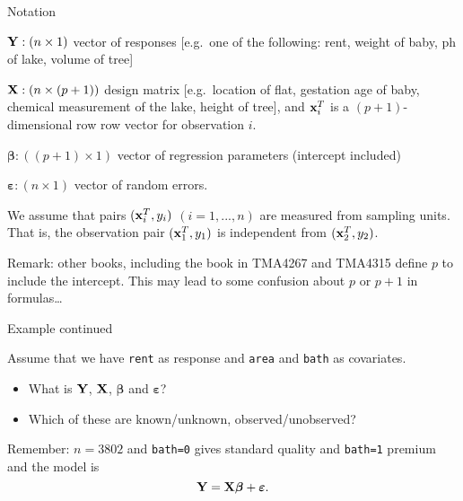 \documentclass[ignorenonframetext,]{beamer}
\providecommand{\tightlist}{%
  \setlength{\itemsep}{0pt}\setlength{\parskip}{0pt}}
\begin{document}
\begin{frame}

\begin{block}{Notation}

\({\bf Y}: (n \times 1)\) vector of responses {[}e.g.~one of the
following: rent, weight of baby, ph of lake, volume of tree{]}

\({\bf X}: (n \times (p+1))\) design matrix {[}e.g.~location of flat,
gestation age of baby, chemical measurement of the lake, height of
tree{]}, and \({\bf x}_i^T\) is a \((p+1)\)-dimensional row row vector
for observation \(i\).

\({\boldsymbol \beta}: ((p+1) \times 1)\) vector of regression
parameters (intercept included)

\({\boldsymbol \varepsilon}: (n\times 1)\) vector of random errors.

We assume that pairs \(({\bf x}_i^T,y_i)\) \((i=1,...,n)\) are measured
from sampling units. That is, the observation pair \(({\bf x}_1^T,y_1)\)
is independent from \(({\bf x}_2^T,y_2)\).

Remark: other books, including the book in TMA4267 and TMA4315 define
\(p\) to include the intercept. This may lead to some confusion about
\(p\) or \(p+1\) in formulas\ldots{}

\end{block}

\end{frame}

\begin{frame}[fragile]

\begin{block}{Example continued}

Assume that we have \texttt{rent} as response and \texttt{area} and
\texttt{bath} as covariates.

\begin{itemize}
\tightlist
\item
  What is \({\bf Y}\), \({\bf X}\), \(\boldsymbol{\beta}\) and
  \(\boldsymbol{\varepsilon}\)?
\item
  Which of these are known/unknown, observed/unobserved?
\end{itemize}

Remember: \(n=3802\) and \texttt{bath=0} gives standard quality and
\texttt{bath=1} premium and the model is
\[{\bf Y=X \boldsymbol\beta}+{\boldsymbol \varepsilon}.\]

\end{block}

\end{frame}
\end{document}
